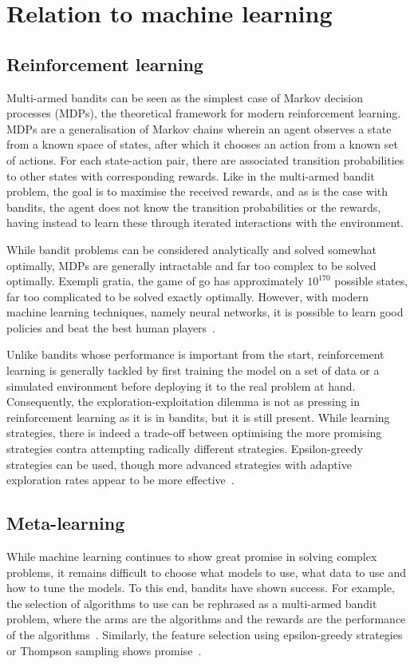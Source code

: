 \section{Relation to machine learning}
\subsection{Reinforcement learning}
Multi-armed bandits can be seen as the simplest case of Markov decision processes (MDPs), the theoretical framework for modern reinforcement learning.
MDPs are a generalisation of Markov chains wherein an agent observes a state from a known space of states, after which it chooses an action from a known set of actions.
For each state-action pair, there are associated transition probabilities to other states with corresponding rewards.
Like in the multi-armed bandit problem, the goal is to maximise the received rewards, and as is the case with bandits, the agent does not know the transition probabilities or the rewards, having instead to learn these through iterated interactions with the environment.

While bandit problems can be considered analytically and solved somewhat optimally, MDPs are generally intractable and far too complex to be solved optimally.
Exempli gratia, the game of go has approximately $10^{170}$ possible states, far too complicated to be solved exactly optimally.
However, with modern machine learning techniques, namely neural networks, it is possible to learn good policies and beat the best human players~\autocite{silver2016}.

Unlike bandits whose performance is important from the start, reinforcement learning is generally tackled by first training the model on a set of data or a simulated environment before deploying it to the real problem at hand.
Consequently, the exploration-exploitation dilemma is not as pressing in reinforcement learning as it is in bandits, but it is still present.
While learning strategies, there is indeed a trade-off between optimising the more promising strategies contra attempting radically different strategies.
Epsilon-greedy strategies can be used, though more advanced strategies with adaptive exploration rates appear to be more effective~\autocite{tokic2011}.


\subsection{Meta-learning}
While machine learning continues to show great promise in solving complex problems, it remains difficult to choose what models to use, what data to use and how to tune the models.
To this end, bandits have shown success.
For example, the selection of algorithms to use can be rephrased as a multi-armed bandit problem, where the arms are the algorithms and the rewards are the performance of the algorithms~\autocite{gagliolo2010}.
Similarly, the feature selection using epsilon-greedy strategies~\autocite{wang2014} or Thompson sampling shows promise~\autocite{bouneffouf2017}.